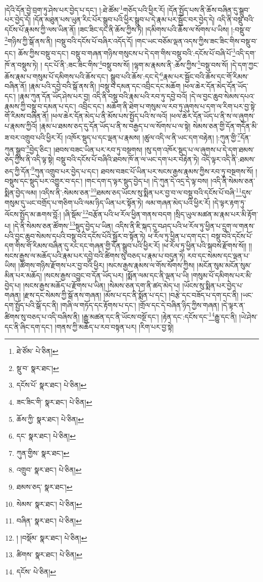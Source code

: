 །དེའི་དོན་བྱེ་བྲག་ཏུ་ཤེས་པར་བྱེད་པ་དང་། །:ཐེ་ཚོམ་\footnote{ཐེ་ཙོམ་  པེ་ཅིན། }གཅོད་པའི་ཕྱིར་རོ། །དོན་སྤྱོད་པས་ནི་ཆོས་བཞིན་དུ་སྒྲུབ་པར་བྱེད་དོ། །དོན་མཐུན་པས་ཡུན་རིང་པོར་སྒྲུབ་པའི་ཕྱིར་སྒྲུབ་པ་དེ་རྣམ་པར་སྦྱོང་བར་བྱེད་དེ། འདི་ནི་བསྡུ་བའི་དངོས་པོ་རྣམས་ཀྱི་ལས་ཡིན་ནོ། །ཟང་ཟིང་དང་ནི་ཆོས་ཀྱིས་ཏེ། །དམིགས་པའི་ཆོས་ལ་སོགས་པ་ཡིས། །:བསྡུ་བ་\footnote{སྡུ་བ་  སྣར་ཐང་། }གཉིས་ཀྱི་སྒོ་ནས་ནི། །བསྡུ་བའི་དངོས་པོ་བཞིར་འདོད་དོ། །གང་ཡང་བཅོམ་ལྡན་འདས་ཀྱིས་ཟང་ཟིང་གིས་བསྡུ་བ་དང་། ཆོས་ཀྱིས་བསྡུ་བ་དང་། བསྡུ་བ་གཞན་གཉིས་གསུངས་པ་དེ་དག་གིས་བསྡུ་བའི་:དངོས་པོ་བཞི་པོ་\footnote{དངོས་པོ་  སྣར་ཐང་།  པེ་ཅིན། }འདི་དག་ཁོ་ན་བསྡུས་ཏེ། །
དང་པོ་ནི་:ཟང་ཟིང་གིས་\footnote{ཟང་ཟིང་གི་  སྣར་ཐང་།  པེ་ཅིན། }བསྡུ་བས་སོ། །ལྷག་མ་རྣམས་ནི་:ཆོས་ཀྱིས་\footnote{ཆོས་ཀྱི་  སྣར་ཐང་།  པེ་ཅིན། }བསྡུ་བས་སོ། །དེ་དག་ཀྱང་ཆོས་རྣམ་པ་གསུམ་པོ་དམིགས་པའི་ཆོས་དང་། སྒྲུབ་པའི་ཆོས་:དང་དེ་\footnote{དང་  སྣར་ཐང་།  པེ་ཅིན། }རྣམ་པར་སྦྱོང་བའི་ཆོས་དང་གོ་རིམས་བཞིན་ནོ། །རྣམ་པའི་དབྱེ་བའི་སྒོ་ནས་ནི། །བསྡུ་བ་དམན་དང་འབྲིང་དང་མཆོག །ཕལ་ཆེར་དོན་མེད་དོན་ཡོད་དང་། །རྣམ་ཀུན་དོན་ཡོད་ཤེས་པར་བྱ། འདི་ནི་བསྡུ་བའི་རྣམ་པའི་རབ་ཏུ་དབྱེ་བའོ། །དེ་ལ་བྱང་ཆུབ་སེམས་དཔའ་རྣམས་ཀྱི་བསྡུ་བ་དམན་པ་དང་། འབྲིང་དང་། མཆོག་ནི་ཐེག་པ་གསུམ་ལ་རབ་ཏུ་ཞུགས་པ་དག་ལ་རིག་པར་བྱ་སྟེ་གོ་རིམས་བཞིན་ནོ། །ཕལ་ཆེར་དོན་མེད་པ་ནི་མོས་པས་སྤྱོད་པའི་ས་ལའོ། །ཕལ་ཆེར་དོན་ཡོད་པ་ནི་ས་ལ་ཞུགས་པ་རྣམས་ཀྱིའོ། །རྣམ་པ་ཐམས་ཅད་དུ་དོན་ཡོད་པ་ནི་ས་བརྒྱད་པ་ལ་སོགས་པ་ལ་སྟེ། སེམས་ཅན་གྱི་དོན་གདོན་མི་ཟ་བར་འགྲུབ་པའི་ཕྱིར་རོ། །འཁོར་སྡུད་པ་དང་ལྡན་པ་རྣམས། །ཚུལ་འདི་ལ་ནི་ཡང་དག་བརྟེན། །:ཀུན་གྱི་\footnote{ཀུན་གྱིས་  སྣར་ཐང་། }དོན་ཀུན་སྒྲུབ་\footnote{འགྲུབ་  སྣར་ཐང་།  པེ་ཅིན། }བྱེད་ཅིང་། །ཐབས་བཟང་ཡིན་པར་རབ་ཏུ་བསྔགས། །སུ་དག་འཁོར་སྡུད་པ་ལ་ཞུགས་པ་དེ་དག་ཐམས་ཅད་ཀྱིས་ནི་འདི་ལྟ་སྟེ། བསྡུ་བའི་དངོས་པོ་བཞིའི་ཐབས་ཁོ་ན་ལ་ཡང་དག་པར་བརྟེན་ཏེ། འདི་ལྟར་འདི་ནི་:ཐམས་ཅད་ཀྱི་དོན་\footnote{ཐམས་ཅད་  སྣར་ཐང་། }ཀུན་འགྲུབ་པར་བྱེད་པ་དང་། ཐབས་བཟང་པོ་ཡིན་པར་སངས་རྒྱས་རྣམས་ཀྱིས་རབ་ཏུ་བསྔགས་སོ། །བསྡུས་དང་སྡུད་པར་འགྱུར་བ་དང་། །གང་དག་ད་ལྟར་སྡུད་བྱེད་པ། །དེ་ཀུན་དེ་འདྲ་དེ་ལྟ་བས། །འདི་ནི་སེམས་ཅན་སྨིན་བྱེད་ལམ། །འདིས་ནི་:སེམས་ཅན་\footnote{སེམས་  སྣར་ཐང་།  པེ་ཅིན། }ཐམས་ཅད་ཡོངས་སུ་སྨིན་པར་བྱ་བ་ལ་བསྡུ་བའི་དངོས་པོ་བཞི་\footnote{བཞིན་  སྣར་ཐང་།  པེ་ཅིན། }དུས་གསུམ་དུ་ཡང་བགྲོད་པ་གཅིག་པའི་ལམ་ཉིད་ཡིན་པར་སྟོན་ཏེ། ལམ་གཞན་མེད་པའི་ཕྱིར་རོ། །དེ་ལྟར་རྟག་ཏུ་ལོངས་སྤྱོད་མ་ཆགས་བློ:། །ཞི་སྡོམ་\footnote{། །བསྡོམ་  སྣར་ཐང་།  པེ་ཅིན། }བརྩོན་པའི་ཕ་རོལ་ཕྱིན་གནས་བདག །སྲིད་ཡུལ་མཚན་མ་རྣམ་པར་མི་རྟོག་པ། །དེ་ནི་སེམས་ཅན་ཚོགས་\footnote{ཚིགས་  སྣར་ཐང་།  པེ་ཅིན། }སྡུད་བྱེད་པ་ཡིན། འདིས་ནི་ཇི་སྐད་དུ་བཤད་པའི་ཕ་རོལ་ཏུ་ཕྱིན་པ་དྲུག་ལ་གནས་པའི་བྱང་ཆུབ་སེམས་དཔའི་བསྡུ་བའི་དངོས་པོའི་སྦྱོར་བ་སྟོན་ཏེ། ཕ་རོལ་ཏུ་ཕྱིན་པ་དག་དང་། བསྡུ་བའི་དངོས་པོ་དག་གིས་གོ་རིམས་བཞིན་དུ་རང་དང་གཞན་གྱི་དོན་སྒྲུབ་པའི་ཕྱིར་རོ། །ཕ་རོལ་ཏུ་ཕྱིན་པའི་སྐབས་རྫོགས་སོ།། །།སངས་རྒྱས་ལ་མཆོད་པའི་རྣམ་པར་དབྱེ་བའི་ཚིགས་སུ་བཅད་པ་རྣམ་པ་བདུན་ཏེ། རབ་དང་སེམས་དང་ལྡན་པ་ཡིས། །ཚོགས་གཉིས་རྫོགས་པར་བྱ་བའི་ཕྱིར། །སངས་རྒྱས་རྣམས་ལ་གོས་སོགས་ཀྱིས། །མངོན་སུམ་མངོན་སུམ་མིན་པར་མཆོད། །སངས་རྒྱས་འབྱུང་བ་དོན་ཡོད་པར། །སྨོན་ལམ་དང་ནི་ལྡན་པ་ཡི། །གསུམ་པོ་དམིགས་པར་མི་བྱེད་པ། །སངས་རྒྱས་མཆོད་པ་རྫོགས་པ་ཡིན། །སེམས་ཅན་དག་ནི་ཚད་མེད་པ། །ཡོངས་སུ་སྨིན་པར་བྱེད་པ་གཞན། །རྫས་དང་སེམས་ཀྱི་སྒོ་ནས་གཞན། །མོས་པ་དང་ནི་སྨོན་པ་དང་། །བརྩེ་དང་བཟོད་པ་དག་དང་ནི། །ཡང་དག་སྤྱོད་པའི་སྒོ་དང་ནི། །གཞི་ལ་གཏོད་དང་རྟོགས་པ་དང་། །གྲོལ་དང་དེ་བཞིན་ཉིད་ཀྱིས་གཞན། །དེ་ལྟར་ན་ཚིགས་སུ་བཅད་པ་འདི་བཞིས་ནི། །རྒྱུ་མཚན་དང་ནི་ཡོངས་བསྔོ་དང་། །རྟེན་དང་:དངོས་དང་\footnote{དངོས་  པེ་ཅིན། }རྒྱུ་དང་ནི། །ཡེ་ཤེས་དང་ནི་ཞིང་དག་དང་། །གནས་ཀྱི་མཆོད་པ་རབ་བསྟན་པར། །རིག་པར་བྱ་སྟེ། 